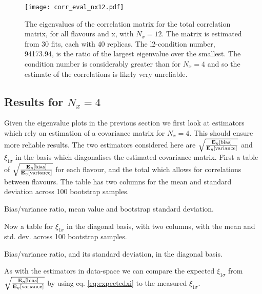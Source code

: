 \begin{figure}[]
    \centering
    \texttt{[image: corr\_eval\_nx12.pdf]}
    \caption{The eigenvalues of the correlation matrix for the total correlation
    matrix, for all flavours and x, with $N_x=12$. The matrix is estimated from
    30 fits, each with 40 replicas.
    The l2-condition number, 94173.94, is the ratio of the
    largest eigenvalue over the smallest. The condition number is considerably
    greater than for $N_x=4$ and so the estimate of the correlations is likely
    very unreliable.}
    \label{fig:correignx12}
\end{figure}

\FloatBarrier

\subsection{Results for $N_x=4$}

Given the eigenvalue plots in the previous section we first look at estimators
which rely on estimation of a covariance matrix for $N_x=4$. This should ensure
more reliable results. The two estimators considered here are
$\sqrt{\frac{\mathbf{E}_{\eta}\left[ {\rm bias} \right]}{\mathbf{E}_{\eta}\left[ {\rm variance} \right]}}$ and $\xi_{1\sigma}$ in the basis
which diagonalises the estimated covariance matrix. First a table of
$\sqrt{\frac{\mathbf{E}_{\eta}\left[ {\rm bias} \right]}{\mathbf{E}_{\eta}\left[ {\rm variance} \right]}}$ for each flavour, and the total
which allows for correlations between flavours. The table has two columns
for the mean and standard deviation across 100 bootstrap samples.

\begin{table}[h!]
    \label{tab:pdf_sqrt_ratio_nx4}
    
    \caption{Bias/variance ratio, mean value and bootstrap standard deviation. }
\end{table}

\FloatBarrier

Now a table for $\xi_{1\sigma}$ in the diagonal basis, with two columns, with
the mean and std. dev. across 100 bootstrap samples.

\begin{table}[h!]
    \label{tab:latex_tables/pdf_xi_nx4}
    
    \caption{Bias/variance ratio, and its standard deviation, in the diagonal basis. }
\end{table}

\FloatBarrier

As with the estimators in data-space we can compare the expected $\xi_{1\sigma}$
from $\sqrt{\frac{\mathbf{E}_{\eta}\left[ {\rm bias} \right]}{\mathbf{E}_{\eta}\left[ {\rm variance} \right]}}$ by using eq. \eqref{eq:expectedxi}
to the measured $\xi_{1\sigma}$.

